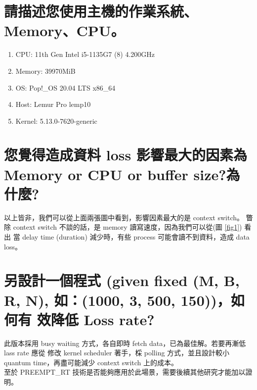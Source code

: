 \documentclass[a4paper, 12pt]{article}
\begin{document}
\begin{CJK*}{UTF8}{bsmi}
    \section{請描述您使用主機的作業系統、Memory、CPU。}
    \begin{enumerate}
        \item CPU: 11th Gen Intel i5-1135G7 (8) \@ 4.200GHz
        \item Memory: 39970MiB
        \item OS: Pop!\_OS 20.04 LTS x86\_64
        \item Host: Lemur Pro lemp10
        \item Kernel: 5.13.0-7620-generic
    \end{enumerate}

    \section{您覺得造成資料 loss 影響最大的因素為 Memory or CPU or buffer size?為什麼?}
    以上皆非，我們可以從上面兩張圖中看到，影響因素最大的是 context switch。
    瞥除 context switch 不談的話，是 memory 讀寫速度，因為我們可以從(圖 \ref{fig1}) 看出
    當 delay time (duration) 減少時，有些 process 可能會讀不到資料，造成 data loss。

    \section{另設計一個程式 (given fixed (M, B, R, N), 如：(1000, 3, 500, 150))，如何有
      效降低 Loss rate?}
    此版本採用 busy waiting 方式，各自即時 fetch data，已為最佳解。若要再漸低 lass rate 應從
    修改 kernel scheduler 著手，棌 polling 方式，並且設計較小 quantum time，再盡可能減少 context
    switch 上的成本。\\
    至於 PREEMPT\_RT 技術是否能夠應用於此場景，需要後續其他研究才能加以證明。

\end{CJK*}
\end{document}
